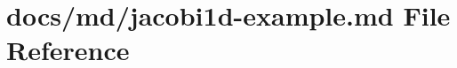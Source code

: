 \hypertarget{jacobi1d-example_8md}{}\section{docs/md/jacobi1d-\/example.md File Reference}
\label{jacobi1d-example_8md}
